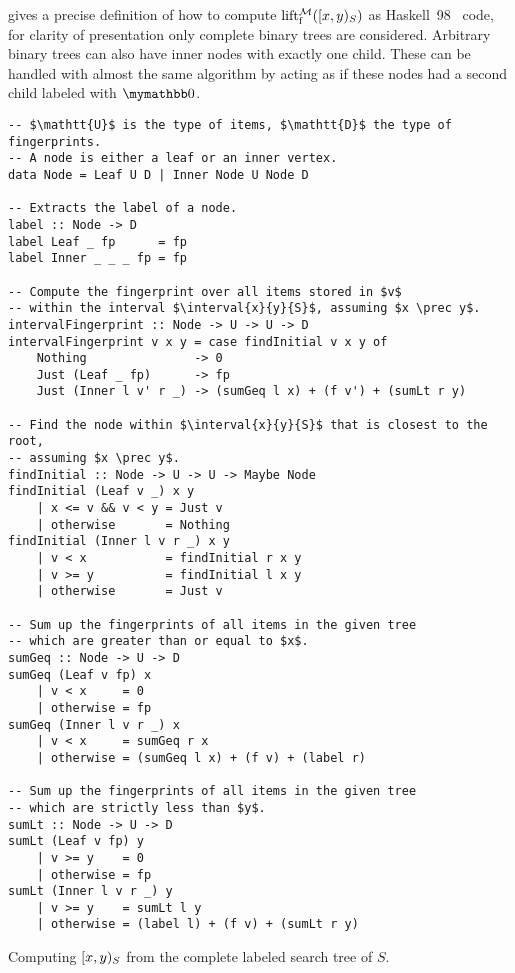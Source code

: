  gives a precise definition of how to compute $\operatorname{lift_{\operatorname{f}}^{\mathcal{M}}}([{x},{y})_{S})$ as Haskell~98~\cite{jones2003haskell} code, for clarity of presentation only complete binary trees are considered. Arbitrary binary trees can also have inner nodes with exactly one child. These can be handled with almost the same algorithm by acting as if these nodes had a second child labeled with $\neutraladd$.

\begin{listing}
\begin{verbatim}
-- $\mathtt{U}$ is the type of items, $\mathtt{D}$ the type of fingerprints.
-- A node is either a leaf or an inner vertex.
data Node = Leaf U D | Inner Node U Node D

-- Extracts the label of a node.
label :: Node -> D
label Leaf _ fp      = fp
label Inner _ _ _ fp = fp

-- Compute the fingerprint over all items stored in $v$
-- within the interval $\interval{x}{y}{S}$, assuming $x \prec y$.
intervalFingerprint :: Node -> U -> U -> D
intervalFingerprint v x y = case findInitial v x y of
    Nothing               -> 0
    Just (Leaf _ fp)      -> fp
    Just (Inner l v' r _) -> (sumGeq l x) + (f v') + (sumLt r y)
                                           
-- Find the node within $\interval{x}{y}{S}$ that is closest to the root,
-- assuming $x \prec y$.
findInitial :: Node -> U -> U -> Maybe Node
findInitial (Leaf v _) x y
    | x <= v && v < y = Just v
    | otherwise       = Nothing
findInitial (Inner l v r _) x y
    | v < x           = findInitial r x y
    | v >= y          = findInitial l x y
    | otherwise       = Just v

-- Sum up the fingerprints of all items in the given tree
-- which are greater than or equal to $x$.
sumGeq :: Node -> U -> D
sumGeq (Leaf v fp) x
    | v < x     = 0
    | otherwise = fp
sumGeq (Inner l v r _) x
    | v < x     = sumGeq r x
    | otherwise = (sumGeq l x) + (f v) + (label r)

-- Sum up the fingerprints of all items in the given tree
-- which are strictly less than $y$.
sumLt :: Node -> U -> D
sumLt (Leaf v fp) y
    | v >= y    = 0
    | otherwise = fp
sumLt (Inner l v r _) y
    | v >= y    = sumLt l y
    | otherwise = (label l) + (f v) + (sumLt r y)
\end{verbatim}
\caption{Computing $\interval{x}{y}{S}$ from the complete labeled search tree of $S$.}
\label{listing:subset-fingerprint}
\end{listing}

